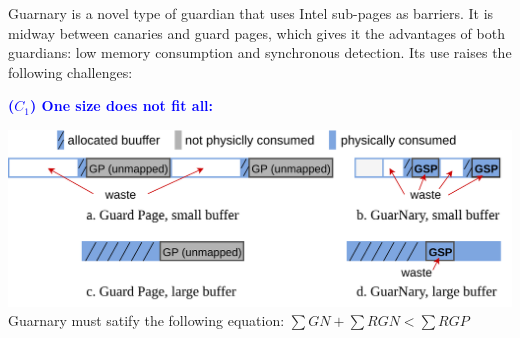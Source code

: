 \documentclass[landscape,a0paper,fontscale=0.3]{baposter} %
\begin{document}
\begin{poster}
{\begin{multicols}{2}
    \end{multicols}
}



{
\renewcommand{\section}[2]{\vskip 0.05em} %
\nocite{*} %
\small{ %

}
}


{
    Guarnary is a novel type of guardian that uses Intel sub-pages as barriers. It is midway between canaries and guard pages, which gives it the advantages of both guardians: low memory consumption and synchronous detection. Its use raises the following challenges:
    \begin{multicols}{2}
        \textcolor{blue}{\textbf{($C_1$) One size does not fit all:}} 
        \begin{center}
            \includegraphics[width=.85\columnwidth]{figures/challenge1}
            Guarnary must satify the following equation: $\sum GN + \sum RGN < \sum RGP$
        \end{center}


\end{multicols}}
\end{poster}
\end{document}
